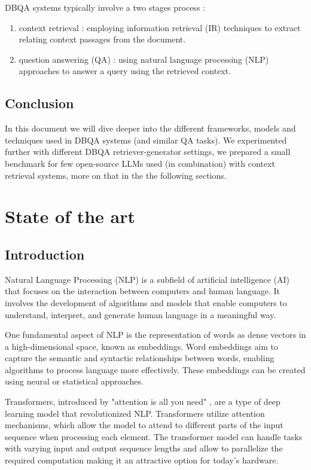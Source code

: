 \documentclass[a4paper,12pt]{article}
\begin{document}
DBQA systems typically involve a two stages process : 
\begin{enumerate}
	\item context retrieval : employing information retrieval (IR) techniques to extract relating context passages from the document.
	\item question answering (QA) : using natural language processing (NLP) approaches to answer a query using the retrieved context.  
\end{enumerate}  

\subsection{Conclusion}
In this document we will dive deeper into the different frameworks, models and techniques used in DBQA systems (and similar QA tasks). 
We experimented further with different DBQA retriever-generator settings, we prepared a small benchmark for few open-source LLMs used (in combination) 
with context retrieval systems, more on that in the the following sections. 

\clearpage
\section{State of the art}

\subsection{Introduction}
Natural Language Processing (NLP) is a subfield of artificial intelligence (AI) that focuses on the interaction between computers and human language. 
It involves the development of algorithms and models that enable computers to understand, interpret, and generate human language in a meaningful way.

One fundamental aspect of NLP is the representation of words as dense vectors in a high-dimensional space, known as embeddings. 
Word embeddings aim to capture the semantic and syntactic relationships between words, enabling algorithms to process language more effectively. 
These embeddings can be created using neural or statistical approaches.

Transformers, introduced by "attention is all you need" \cite{attention}, are a type of deep learning model that revolutionized NLP. 
Transformers utilize attention mechanisms, which allow the model to attend to different parts of the input sequence when processing each element. 
The transformer model can handle tasks with varying input and output sequence lengths and allow to parallelize the required computation making it an attractive option 
for today's hardware.
\end{document}

